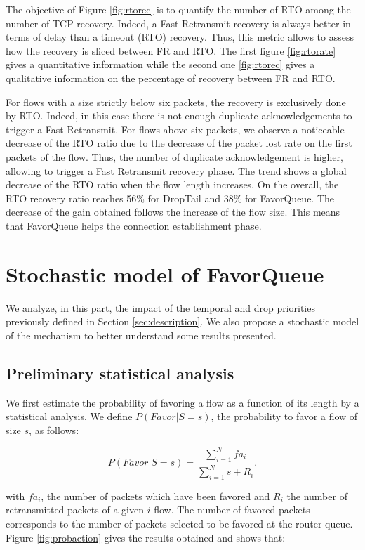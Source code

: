 \documentclass{elsart}
\begin{document}
The objective of Figure \ref{fig:rtorec} is to quantify the number of RTO among the number of TCP recovery. Indeed, a Fast Retransmit recovery is always better in terms of delay than a timeout (RTO) recovery. Thus, this metric allows to assess how the recovery is sliced between FR and RTO. The first figure \ref{fig:rtorate} gives a quantitative information while the second one \ref{fig:rtorec} gives a qualitative information on the percentage of recovery between FR and RTO.

For flows with a size strictly below six packets, the recovery is exclusively done by RTO. Indeed, in this case there is not enough duplicate acknowledgements to trigger a Fast Retransmit.
For flows above six packets, we observe a noticeable decrease of the RTO ratio due to the decrease of the packet lost rate on the first packets of the flow. Thus, the number of duplicate acknowledgement is higher, allowing to
trigger a Fast Retransmit recovery phase. The trend shows a global decrease of the RTO ratio when the flow length increases. 
On the overall, the RTO recovery ratio reaches 56\% for DropTail and 38\% for FavorQueue.
The decrease of the gain obtained follows the increase of the flow size. This means that FavorQueue helps the connection establishment phase.

\section{Stochastic model of FavorQueue}
\label{sec:model}

We analyze, in this part, the impact of the temporal and drop priorities previously defined in Section \ref{sec:description}. We also propose a stochastic model of the mechanism to better understand some results presented. 

\subsection{Preliminary statistical analysis}

We first estimate the probability of favoring a flow as a function of its length by a statistical analysis. We define $P(Favor|S=s)$, the probability to favor a flow of size $s$, as follows:

\begin{equation}
\label{eq:favor}
P(Favor|S=s) = \frac{\sum_{i=1}^{N} fa_{i} }{\sum_{i=1}^{N} s + R_{i}}\textrm{.}
\end{equation} 

with $fa_{i}$, the number of packets which have been favored and $R_{i}$ the number of retransmitted packets of a given $i$ flow.
The number of favored packets corresponds to the number of packets selected to be favored at the router queue.
Figure \ref{fig:probaction} gives the results obtained and shows that:
\end{document}
